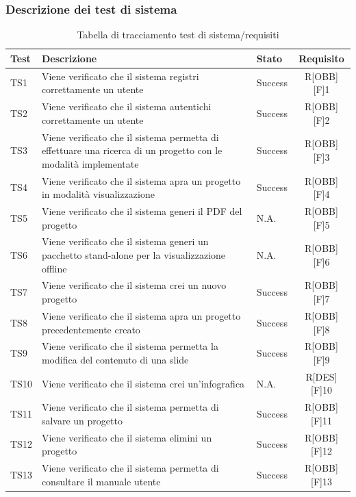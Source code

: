 \subsubsection{Descrizione dei test di sistema}
\begin{center}
	\begin{table}[h]
		\begin{tabular}{|l|p{}|l|c|}
			\toprule
			
			\textbf{Test} & \textbf{Descrizione} & \textbf{Stato} & \textbf{Requisito} \\
			
			\midrule
			TS1 & Viene verificato che il sistema registri correttamente un utente & Success & R[OBB][F]1\\ \midrule
			TS2 & Viene verificato che il sistema autentichi correttamente un utente & Success & R[OBB][F]2\\  \midrule
			TS3	& Viene verificato che il sistema permetta di effettuare una ricerca di un progetto con le modalità implementate & Success & R[OBB][F]3\\ \midrule
			TS4	& Viene verificato che il sistema apra un progetto in modalità visualizzazione & Success & R[OBB][F]4\\ \midrule
			TS5 & Viene verificato che il sistema generi il PDF del progetto & N.A. & R[OBB][F]5\\ \midrule
			TS6 & Viene verificato che il sistema generi un pacchetto stand-alone per la visualizzazione offline & N.A. & R[OBB][F]6\\ \midrule
			TS7 & Viene verificato che il sistema crei un nuovo progetto & Success & R[OBB][F]7\\ \midrule
			TS8 & Viene verificato che il sistema apra un progetto precedentemente creato & Success & R[OBB][F]8\\ \midrule
			TS9 & Viene verificato che il sistema permetta la modifica del contenuto di una \gls{slide} & Success & R[OBB][F]9\\ \midrule
			TS10 & Viene verificato che il sistema crei un'\gls{infografica} & N.A. & R[DES][F]10\\ \midrule
			TS11 & Viene verificato che il sistema permetta di salvare un progetto & Success & R[OBB][F]11\\ \midrule
			TS12 & Viene verificato che il sistema elimini un progetto & Success & R[OBB][F]12\\ \midrule
			TS13 & Viene verificato che il sistema permetta di consultare il manuale utente & Success & R[OBB][F]13\\
			
						
			\bottomrule
			
		\end{tabular}
		\caption{Tabella di tracciamento test di sistema/requisiti}
		
	\end{table}
	
\end{center}

